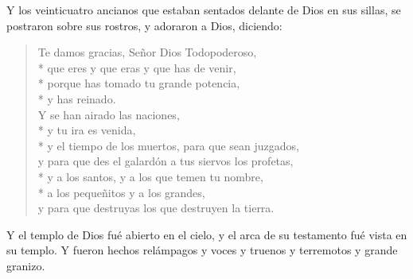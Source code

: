 Y los veinticuatro ancianos que estaban sentados delante de Dios en sus sillas, se postraron sobre sus rostros, y adoraron a Dios, 
diciendo:
\begin{verse}
Te damos gracias, Señor Dios Todopoderoso,\\*\vin
que eres y que eras y que has de venir,\\*
porque has tomado tu grande potencia,\\*\vin
y has reinado.\\ 
Y se han airado las naciones,\\*\vin
y tu ira es venida,\\*\vin
y el tiempo de los muertos, para que sean juzgados,\\
y para que des el galardón a tus siervos los profetas,\\*\vin
y a los santos, y a los que temen tu nombre,\\*\vin
a los pequeñitos y a los grandes,%
	\\
y para que destruyas los que destruyen la tierra.%
\end{verse}
Y el templo de Dios fué abierto en el cielo, y el arca de su testamento fué vista en su templo. Y fueron hechos relámpagos y voces y truenos y terremotos y grande granizo.%
